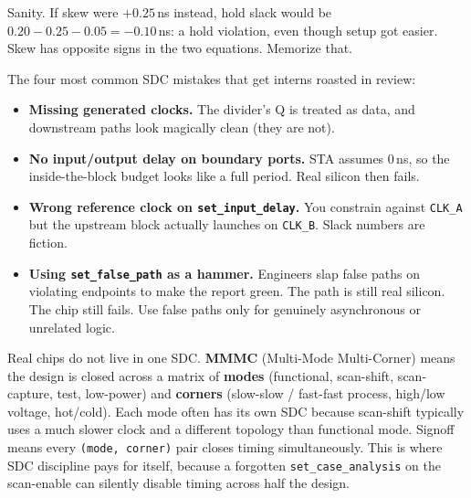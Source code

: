  Sanity. If skew were $+0.25$\,ns instead, hold slack would be $0.20 - 0.25 - 0.05 = -0.10$\,ns: a hold violation, even though setup got easier. Skew has opposite signs in the two equations. Memorize that.

\begin{pitfall}
The four most common SDC mistakes that get interns roasted in review:
\begin{itemize}
  \item \textbf{Missing generated clocks.} The divider's Q is treated as data, and downstream paths look magically clean (they are not).
  \item \textbf{No input/output delay on boundary ports.} STA assumes 0\,ns, so the inside-the-block budget looks like a full period. Real silicon then fails.
  \item \textbf{Wrong reference clock on \texttt{set\_input\_delay}.} You constrain against \texttt{CLK\_A} but the upstream block actually launches on \texttt{CLK\_B}. Slack numbers are fiction.
  \item \textbf{Using \texttt{set\_false\_path} as a hammer.} Engineers slap false paths on violating endpoints to make the report green. The path is still real silicon. The chip still fails. Use false paths only for genuinely asynchronous or unrelated logic.
\end{itemize}
\end{pitfall}

\begin{sidebar}
Real chips do not live in one SDC. \textbf{MMMC} (Multi-Mode Multi-Corner) means the design is closed across a matrix of \textbf{modes} (functional, scan-shift, scan-capture, test, low-power) and \textbf{corners} (slow-slow / fast-fast process, high/low voltage, hot/cold). Each mode often has its own SDC because scan-shift typically uses a much slower clock and a different topology than functional mode. Signoff means every \texttt{(mode, corner)} pair closes timing simultaneously. This is where SDC discipline pays for itself, because a forgotten \texttt{set\_case\_analysis} on the scan-enable can silently disable timing across half the design.
\end{sidebar}

